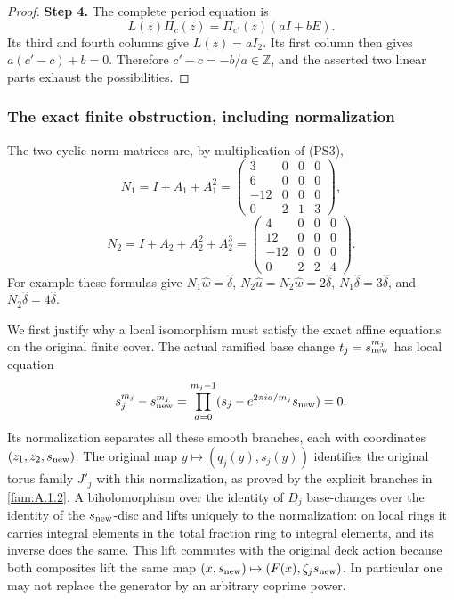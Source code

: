 \begin{proof}
\par\smallskip\noindent\textbf{Step 4.} The complete period equation is
\[
                   L(z)\Pi_c(z)=\Pi_{c'}(z)(aI+bE).
 \tag{PS8}\label{pshift:eq:period-morphism}
\]
Its third and fourth columns give $L(z)=aI_2$. Its first column
then gives $a(c'-c)+b=0$. Therefore $c'-c=-b/a\in\mathbb Z$,
and the asserted two linear parts exhaust the possibilities.
\end{proof}

\subsubsection{The exact finite obstruction, including normalization}

The two cyclic norm matrices are, by multiplication of (PS3),
\[
 N_1=I+A_1+A_1^2=
 \begin{pmatrix}3&0&0&0\\6&0&0&0\\-12&0&0&0\\0&2&1&3\end{pmatrix},
\]
\[
 N_2=I+A_2+A_2^2+A_2^3=
 \begin{pmatrix}4&0&0&0\\12&0&0&0\\-12&0&0&0\\0&2&2&4\end{pmatrix}.
 \tag{PS9}\label{pshift:eq:norms}
\]
For example these formulas give
$N_1\widehat w=\widehat\delta$,
$N_2\widehat u=N_2\widehat w=2\widehat\delta$,
$N_1\widehat\delta=3\widehat\delta$, and
$N_2\widehat\delta=4\widehat\delta$.

We first justify why a local isomorphism must satisfy the exact affine
equations on the original finite cover. The actual ramified base change
$t_j=s_{\rm new}^{m_j}$ has local equation
\[
 s_j^{m_j}-s_{\rm new}^{m_j}
   =\prod_{a=0}^{m_j-1}(s_j-e^{2\pi ia/m_j}s_{\rm new})=0.
\]
Its normalization separates all these smooth branches, each with
coordinates $(z_1,z_2,s_{\rm new})$. The original map
$y\mapsto(q_j(y),s_j(y))$ identifies the original torus family $J'_j$
with this normalization, as proved by the explicit branches in
\cref{fam:A.1.2}. A biholomorphism over the identity of
$D_j$ base-changes over the identity of the $s_{\rm new}$-disc and lifts uniquely
to the normalization: on local rings it carries integral elements in
the total fraction ring to integral elements, and its inverse does
the same. This lift commutes with the original deck action because
both composites lift the same map $(x,s_{\rm new})\mapsto(F(x),\zeta_j s_{\rm new})$.
In particular one may not replace the generator by an arbitrary
coprime power.

